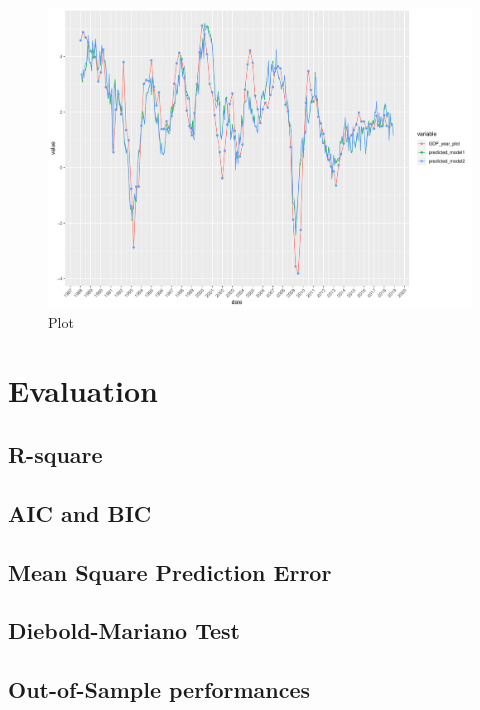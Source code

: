 \documentclass[12pt,a4paper,oneside]{book}
\begin{document}
\begin{figure}[H]
    \centering
    \captionsetup{justification=centering}
    \includegraphics[scale=0.5]{Graphs/pred3.pdf}
    \caption{Plot }
    \label{A_corplot}
\end{figure}



\section{Evaluation}

\subsection{R-square}

\subsection{AIC and BIC}

\subsection{Mean Square Prediction Error}

\subsection{Diebold-Mariano Test}



\subsection{Out-of-Sample performances}
\end{document}
